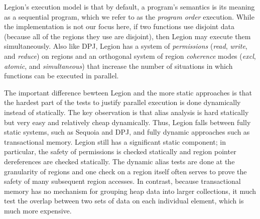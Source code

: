 Legion's execution model is that by default, a program's semantics is
its meaning as a sequential program, which we refer to as the {\em
program order} execution.  While the
implementation is not our focus here, if two functions use
disjoint data (because all of the regions they use are disjoint), then
Legion may execute them simultaneously.  Also like DPJ,
Legion has a system of {\em permissions} ({\em read}, {\em write}, and
{\em reduce}) on regions and an orthogonal system of region {\em
coherence} modes ({\em excl}, {\em atomic}, and {\em simultaneous})
that increase the number of situations in which functions can be
executed in parallel.

The important difference bewteen Legion and the more static approaches
is that the hardest part of the tests to justify parallel execution is
done dynamically instead of statically.  The key observation is that
alias analysis is hard statically but very easy and relatively cheap
dynamically.  Thus, Legion falls between fully static systems, such as
Sequoia and DPJ, and fully dynamic approaches such as transactional
memory.  Legion still has a significant static component; in
particular, the safety of permissions is checked statically and region
pointer dereferences are checked statically.  The dynamic alias tests
are done at the granularity of regions and one check on a region
itself often serves to prove the safety of many subsequent region
accesses.  In contrast, because transactional memory has no mechanism
for grouping heap data into larger collections, it much test the
overlap between two sets of data on each individual element, which is
much more expensive.


